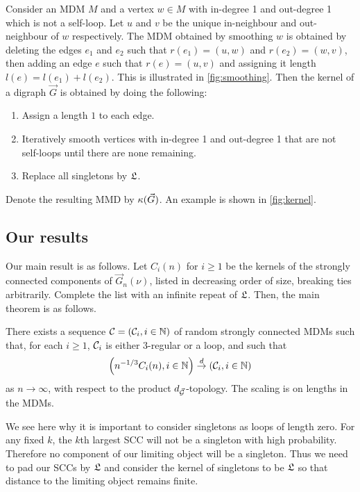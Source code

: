 Consider an MDM $M$ and a vertex $w \in M$ with in-degree 1 and out-degree 1 which is not a self-loop. Let $u$ and $v$ be the unique in-neighbour and out-neighbour of $w$ respectively. The MDM obtained by smoothing $w$ is obtained by deleting the edges $e_1$ and $e_2$ such that $r(e_1) = (u, w)$ and $r(e_2) = (w, v)$, then adding an edge $e$ such that $r(e) = (u, v)$ and assigning it length $l(e) = l(e_1) + l(e_2)$. This is illustrated in \cref{fig:smoothing}. Then the kernel of a digraph $\vec{G}$ is obtained by doing the following:
\begin{enumerate}
    \item Assign a length $1$ to each edge.
    \item Iteratively smooth vertices with in-degree 1 and out-degree 1 that are not self-loops until there are none remaining.
    \item Replace all singletons by $\mathfrak L$.
\end{enumerate}
Denote the resulting MMD by $\kappa(\vec{G})$. An example is shown in \cref{fig:kernel}.

\subsection{Our results}

Our main result is as follows. Let $C_i(n)$ for $i\geq 1$ be the kernels of the strongly connected components of $\vec{G}_n(\nu)$, listed in decreasing order of size, breaking ties arbitrarily. Complete the list with an infinite repeat of $\mathfrak L$. Then, the main theorem is as follows.
\begin{theorem}\label{thm.main}
There exists a sequence ${\mathcal C}=({\mathcal C}_i,i\in {\mathbb N})$ of random strongly connected MDMs such that, for each $i\geq 1$, ${\mathcal C}_i$ is either $3$-regular or a loop, and such that 
$$\left(n^{-1/3}C_i(n),i\in {\mathbb N}\right)\overset{d}{\to}\left({\mathcal C}_i,i\in {\mathbb N}\right)$$
as $n\to \infty$, with respect to the product $d_{\vec{{\mathcal G}}}$-topology. The scaling is on lengths in the MDMs.
\end{theorem}
We see here why it is important to consider singletons as loops of length zero. For any fixed $k$, the $k$th largest SCC will not be a singleton with high probability. Therefore no component of our limiting object will be a singleton. Thus we need to pad our SCCs by $\mathfrak L$ and consider the kernel of singletons to be $\mathfrak L$ so that distance to the limiting object remains finite.

